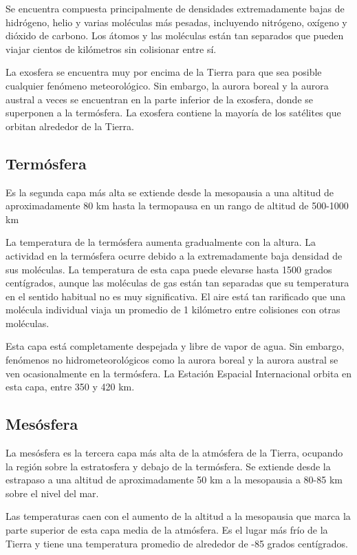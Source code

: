 \documentclass{article} %
\begin{document}
Se encuentra compuesta principalmente de densidades extremadamente bajas de hidrógeno, helio y varias moléculas más pesadas, incluyendo nitrógeno, oxígeno y dióxido de carbono. Los átomos y las moléculas están tan separados que pueden viajar cientos de kilómetros sin colisionar entre sí.

La exosfera se encuentra muy por encima de la Tierra para que sea posible cualquier fenómeno meteorológico. Sin embargo, la aurora boreal y la aurora austral a veces se encuentran en la parte inferior de la exosfera, donde se superponen a la termósfera. La exosfera contiene la mayoría de los satélites que orbitan alrededor de la Tierra.

\subsection{Termósfera}

Es la segunda capa más alta se extiende desde la mesopausia a una altitud de aproximadamente 80 km hasta la termopausa en un rango de altitud de 500-1000 km

La temperatura de la termósfera aumenta gradualmente con la altura. La actividad en la termósfera ocurre debido a la extremadamente baja densidad de sus moléculas. La temperatura de esta capa puede elevarse hasta 1500 grados centígrados, aunque las moléculas de gas están tan separadas que su temperatura en el sentido habitual no es muy significativa. El aire está tan rarificado que una molécula individual viaja un promedio de 1 kilómetro entre colisiones con otras moléculas.

Esta capa está completamente despejada y libre de vapor de agua. Sin embargo, fenómenos no hidrometeorológicos como la aurora boreal y la aurora austral se ven ocasionalmente en la termósfera. La Estación Espacial Internacional orbita en esta capa, entre 350 y 420 km.

\subsection{Mesósfera}

La mesósfera es la tercera capa más alta de la atmósfera de la Tierra, ocupando la región sobre la estratosfera y debajo de la termósfera. Se extiende desde la estrapaso a una altitud de aproximadamente 50 km a la mesopausia a 80-85 km sobre el nivel del mar.

Las temperaturas caen con el aumento de la altitud a la mesopausia que marca la parte superior de esta capa media de la atmósfera. Es el lugar más frío de la Tierra y tiene una temperatura promedio de alrededor de -85 grados centígrados.
\end{document}
